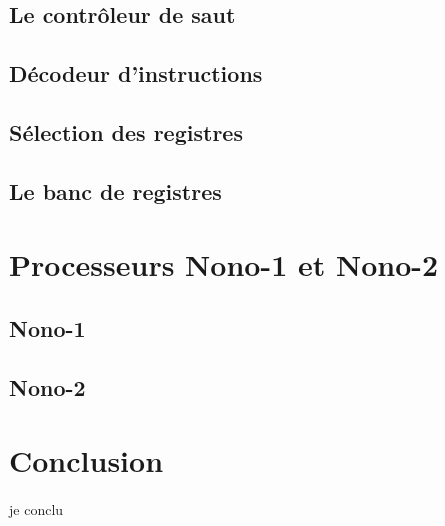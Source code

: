 \documentclass[a4paper]{article}
\begin{document}
		\subsection{Le contrôleur de saut}
			
			
		\subsection{Décodeur d'instructions}
			
			
		\subsection{Sélection des registres}
			
			
		\subsection{Le banc de registres}
			
	
	\newpage	
	\section{Processeurs Nono-1 et Nono-2}
		\subsection{Nono-1}
		\subsection{Nono-2}
	

	
	
	\newpage
	\section*{Conclusion}
		\paragraph{}{je conclu}
		
\end{document}
